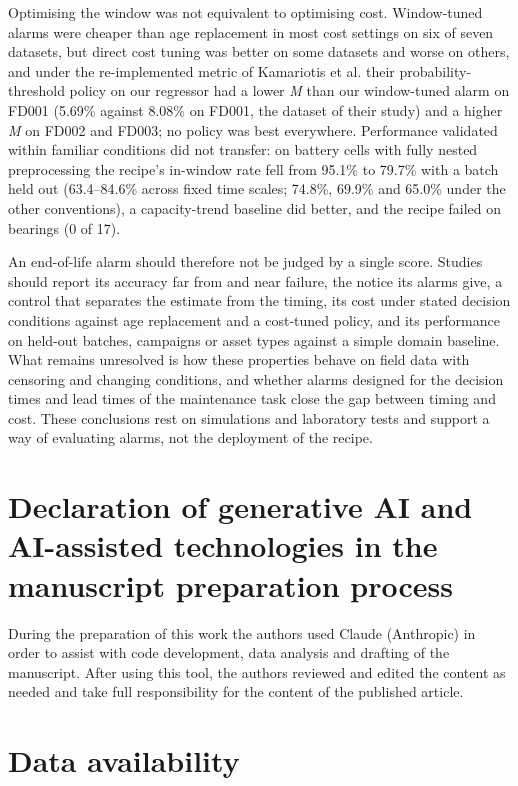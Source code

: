 \documentclass[a4paper,fleqn,doubleblind]{cas-dc}
\begin{document}
Optimising the window was not equivalent to optimising cost. Window-tuned alarms were cheaper than age replacement in most cost settings on six of seven datasets, but direct cost tuning was better on some datasets and worse on others, and under the re-implemented metric of Kamariotis et al. their probability-threshold policy on our regressor had a lower \textit{M} than our window-tuned alarm on FD001 (5.69\% against 8.08\% on FD001, the dataset of their study) and a higher \textit{M} on FD002 and FD003; no policy was best everywhere. Performance validated within familiar conditions did not transfer: on battery cells with fully nested preprocessing the recipe's in-window rate fell from 95.1\% to 79.7\% with a batch held out (63.4--84.6\% across fixed time scales; 74.8\%, 69.9\% and 65.0\% under the other conventions), a capacity-trend baseline did better, and the recipe failed on bearings (0 of 17).

An end-of-life alarm should therefore not be judged by a single score. Studies should report its accuracy far from and near failure, the notice its alarms give, a control that separates the estimate from the timing, its cost under stated decision conditions against age replacement and a cost-tuned policy, and its performance on held-out batches, campaigns or asset types against a simple domain baseline. What remains unresolved is how these properties behave on field data with censoring and changing conditions, and whether alarms designed for the decision times and lead times of the maintenance task close the gap between timing and cost. These conclusions rest on simulations and laboratory tests and support a way of evaluating alarms, not the deployment of the recipe.

\section*{Declaration of generative AI and AI-assisted technologies in the manuscript preparation process}

\noindent During the preparation of this work the authors used Claude (Anthropic) in order to assist with code development, data analysis and drafting of the manuscript. After using this tool, the authors reviewed and edited the content as needed and take full responsibility for the content of the published article.

\section*{Data availability}
\end{document}
